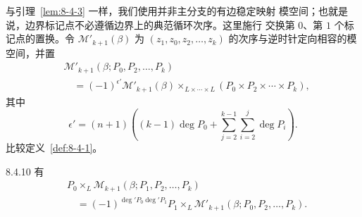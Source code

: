 与引理~\ref{lem:8-4-3} 一样，我们使用并非主分支的有边稳定映射
模空间；也就是说，边界标记点不必遵循边界上的典范循环次序。这里施行
交换第 $0$、第 $1$ 个标记点的置换。令
$\mathcal M'_{k+1}(\beta)$ 为
$(z_1,z_0,z_2,\ldots,z_k)$ 的次序与逆时针定向相容的模空间，并置
\[
\begin{aligned}
 &\mathcal M'_{k+1}(\beta;P_0,P_2,\ldots,P_k)\\
 &\quad={}
 (-1)^{\epsilon'}\mathcal M'_{k+1}(\beta)
 \mathop{\times}_{L\times\cdots\times L}
 (P_0\times P_2\times\cdots\times P_k),
\end{aligned}
\]
其中%
\begin{equation}
 \epsilon'=(n+1)\left(
 (k-1)\deg P_0+
 \sum_{j=2}^{k-1}\sum_{i=2}^{j}\deg P_i
 \right).
 \tag{8.4.9}\label{eq:8-4-9}
\end{equation}
比较定义~\ref{def:8-4-1}。

\begin{lemma}{8.4.10}\label{lem:8-4-10}
有
\[
\begin{aligned}
 &P_0\times_L
 \mathcal M_{k+1}(\beta;P_1,P_2,\ldots,P_k)\\
 &\quad={}
 (-1)^{\deg'P_0\deg'P_1}
 P_1\times_L
 \mathcal M'_{k+1}(\beta;P_0,P_2,\ldots,P_k).
\end{aligned}
\]
\end{lemma}

